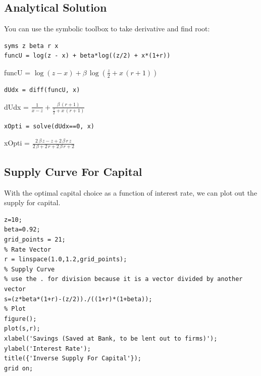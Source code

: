 \documentclass[
]{book}
\begin{document}
\hypertarget{analytical-solution}{%
\subsection{Analytical Solution}\label{analytical-solution}}

You can use the symbolic toolbox to take derivative and find root:

\begin{verbatim}
syms z beta r x
funcU = log(z - x) + beta*log((z/2) + x*(1+r))
\end{verbatim}

funcU =
\(\displaystyle \log \left(z-x\right)+\beta \,\log \left(\frac{z}{2}+x\,{\left(r+1\right)}\right)\)

\begin{verbatim}
dUdx = diff(funcU, x)
\end{verbatim}

dUdx =
\(\displaystyle \frac{1}{x-z}+\frac{\beta \,{\left(r+1\right)}}{\frac{z}{2}+x\,{\left(r+1\right)}}\)

\begin{verbatim}
xOpti = solve(dUdx==0, x)
\end{verbatim}

xOpti =
\(\displaystyle \frac{2\,\beta \,z-z+2\,\beta \,r\,z}{2\,\beta +2\,r+2\,\beta \,r+2}\)

\hypertarget{supply-curve-for-capital}{%
\subsection{Supply Curve For Capital}\label{supply-curve-for-capital}}

With the optimal capital choice as a function of interest rate, we can
plot out the supply for capital.

\begin{verbatim}
z=10;
beta=0.92;
grid_points = 21;
% Rate Vector
r = linspace(1.0,1.2,grid_points);
% Supply Curve
% use the . for division because it is a vector divided by another vector
s=(z*beta*(1+r)-(z/2))./((1+r)*(1+beta));
% Plot
figure();
plot(s,r);
xlabel('Savings (Saved at Bank, to be lent out to firms)');
ylabel('Interest Rate');
title({'Inverse Supply For Capital'});
grid on;
\end{verbatim}
\end{document}
